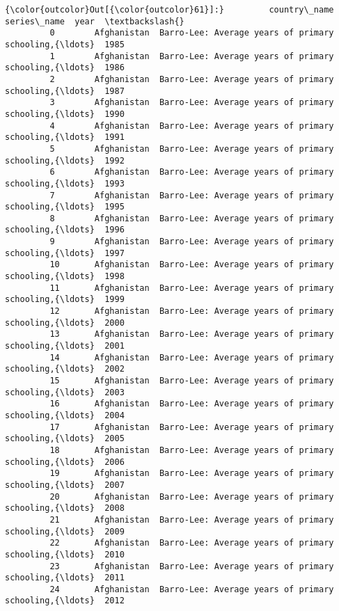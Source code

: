 \documentclass[11pt]{article}
\begin{document}
\begin{Verbatim}[commandchars=\\\{\}]
{\color{outcolor}Out[{\color{outcolor}61}]:}         country\_name                                        series\_name  year  \textbackslash{}
         0        Afghanistan  Barro-Lee: Average years of primary schooling,{\ldots}  1985   
         1        Afghanistan  Barro-Lee: Average years of primary schooling,{\ldots}  1986   
         2        Afghanistan  Barro-Lee: Average years of primary schooling,{\ldots}  1987   
         3        Afghanistan  Barro-Lee: Average years of primary schooling,{\ldots}  1990   
         4        Afghanistan  Barro-Lee: Average years of primary schooling,{\ldots}  1991   
         5        Afghanistan  Barro-Lee: Average years of primary schooling,{\ldots}  1992   
         6        Afghanistan  Barro-Lee: Average years of primary schooling,{\ldots}  1993   
         7        Afghanistan  Barro-Lee: Average years of primary schooling,{\ldots}  1995   
         8        Afghanistan  Barro-Lee: Average years of primary schooling,{\ldots}  1996   
         9        Afghanistan  Barro-Lee: Average years of primary schooling,{\ldots}  1997   
         10       Afghanistan  Barro-Lee: Average years of primary schooling,{\ldots}  1998   
         11       Afghanistan  Barro-Lee: Average years of primary schooling,{\ldots}  1999   
         12       Afghanistan  Barro-Lee: Average years of primary schooling,{\ldots}  2000   
         13       Afghanistan  Barro-Lee: Average years of primary schooling,{\ldots}  2001   
         14       Afghanistan  Barro-Lee: Average years of primary schooling,{\ldots}  2002   
         15       Afghanistan  Barro-Lee: Average years of primary schooling,{\ldots}  2003   
         16       Afghanistan  Barro-Lee: Average years of primary schooling,{\ldots}  2004   
         17       Afghanistan  Barro-Lee: Average years of primary schooling,{\ldots}  2005   
         18       Afghanistan  Barro-Lee: Average years of primary schooling,{\ldots}  2006   
         19       Afghanistan  Barro-Lee: Average years of primary schooling,{\ldots}  2007   
         20       Afghanistan  Barro-Lee: Average years of primary schooling,{\ldots}  2008   
         21       Afghanistan  Barro-Lee: Average years of primary schooling,{\ldots}  2009   
         22       Afghanistan  Barro-Lee: Average years of primary schooling,{\ldots}  2010   
         23       Afghanistan  Barro-Lee: Average years of primary schooling,{\ldots}  2011   
         24       Afghanistan  Barro-Lee: Average years of primary schooling,{\ldots}  2012   

\end{Verbatim}
\end{document}
